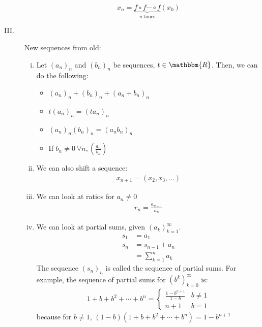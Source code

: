 \documentclass[10pt]{extarticle}
\newcommand{\R}{\mathbbm{R}}
\begin{document}
\begin{description}
\begin{enumerate}[(i)]
            \[x_n = \underbrace{f\circ f\cdots \circ f}_{n~\text{times}}(x_0)\]
        \end{enumerate}
      \item[III.] New sequences from old: 
        \begin{enumerate}[(i)]
          \item Let $(a_n)_n$ and $(b_n)_n$ be sequences, $t\in\R$. Then, we can do the following:
            \begin{itemize}
              \item $(a_n)_n + (b_n)_n + (a_n + b_n)_n$
              \item $t(a_n)_n = (ta_n)_n$
              \item $(a_n)_n(b_n)_n = (a_nb_n)_n$
              \item If $b_n \neq 0~\forall n, \left(\frac{a_n}{b_n}\right)$
            \end{itemize}
          \item We can also shift a sequence:
            \begin{align*}
              x_{n+1} = (x_2,x_3,\dots)
            \end{align*}
          \item We can look at ratios for $a_n\neq 0$
            \begin{align*}
              r_n = \frac{a_{n+1}}{a_n}
            \end{align*}
          \item We can look at partial sums, given $(a_k)_{k=1}^{\infty}$.
            \begin{align*}
              s_1 &= a_1\\
              s_n &= s_{n-1} + a_n\\
                  &= \sum_{k=1}^{n}a_k
            \end{align*}
            The sequence $(s_n)_n$ is called the sequence of partial sums. For example, the sequence of partial sums for $(b^k)_{k=0}^{\infty}$ is:
            \begin{align*}
              1 + b + b^2 + \cdots + b^n = \begin{cases}
                \frac{1-b^{n+1}}{1-b}&b\neq 1\\
                n+1&b=1
              \end{cases}
            \end{align*}
            because for $b \neq 1$, $(1-b)(1+b+b^2+\cdots+b^n) = 1-b^{n+1}$
        \end{enumerate}
      \end{description}
\end{document}
